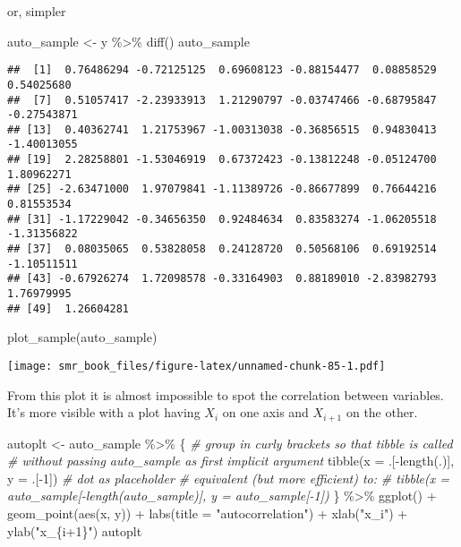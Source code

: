 \documentclass[
  oneside]{book}
\newenvironment{Shaded}{\begin{snugshade}}{\end{snugshade}}
\newcommand{\AttributeTok}[1]{\textcolor[rgb]{0.77,0.63,0.00}{#1}}
\newcommand{\CommentTok}[1]{\textcolor[rgb]{0.56,0.35,0.01}{\textit{#1}}}
\newcommand{\DecValTok}[1]{\textcolor[rgb]{0.00,0.00,0.81}{#1}}
\newcommand{\FunctionTok}[1]{\textcolor[rgb]{0.00,0.00,0.00}{#1}}
\newcommand{\NormalTok}[1]{#1}
\newcommand{\OtherTok}[1]{\textcolor[rgb]{0.56,0.35,0.01}{#1}}
\newcommand{\SpecialCharTok}[1]{\textcolor[rgb]{0.00,0.00,0.00}{#1}}
\newcommand{\StringTok}[1]{\textcolor[rgb]{0.31,0.60,0.02}{#1}}
\begin{document}
or, simpler

\begin{Shaded}
\begin{Highlighting}[]
\NormalTok{auto\_sample }\OtherTok{\textless{}{-}}\NormalTok{ y }\SpecialCharTok{\%\textgreater{}\%}
  \FunctionTok{diff}\NormalTok{()}
\NormalTok{auto\_sample}
\end{Highlighting}
\end{Shaded}

\begin{verbatim}
##  [1]  0.76486294 -0.72125125  0.69608123 -0.88154477  0.08858529  0.54025680
##  [7]  0.51057417 -2.23933913  1.21290797 -0.03747466 -0.68795847 -0.27543871
## [13]  0.40362741  1.21753967 -1.00313038 -0.36856515  0.94830413 -1.40013055
## [19]  2.28258801 -1.53046919  0.67372423 -0.13812248 -0.05124700  1.80962271
## [25] -2.63471000  1.97079841 -1.11389726 -0.86677899  0.76644216  0.81553534
## [31] -1.17229042 -0.34656350  0.92484634  0.83583274 -1.06205518 -1.31356822
## [37]  0.08035065  0.53828058  0.24128720  0.50568106  0.69192514 -1.10511511
## [43] -0.67926274  1.72098578 -0.33164903  0.88189010 -2.83982793  1.76979995
## [49]  1.26604281
\end{verbatim}

\begin{Shaded}
\begin{Highlighting}[]
\FunctionTok{plot\_sample}\NormalTok{(auto\_sample)}
\end{Highlighting}
\end{Shaded}

\texttt{[image: smr\_book\_files/figure-latex/unnamed-chunk-85-1.pdf]}

From this plot it is almost impossible to spot the correlation between variables.
It's more visible with a plot having \(X_i\) on one axis and \(X_{i+1}\) on the other.

\begin{Shaded}
\begin{Highlighting}[]
\NormalTok{autoplt }\OtherTok{\textless{}{-}}\NormalTok{ auto\_sample }\SpecialCharTok{\%\textgreater{}\%}
\NormalTok{  \{ }\CommentTok{\# group in curly brackets so that tibble is called}
    \CommentTok{\# without passing auto\_sample as first implicit argument}
    \FunctionTok{tibble}\NormalTok{(}\AttributeTok{x =}\NormalTok{ .[}\SpecialCharTok{{-}}\FunctionTok{length}\NormalTok{(.)], }\AttributeTok{y =}\NormalTok{ .[}\SpecialCharTok{{-}}\DecValTok{1}\NormalTok{]) }\CommentTok{\# dot as placeholder}
    \CommentTok{\# equivalent (but more efficient) to:}
    \CommentTok{\# tibble(x = auto\_sample[{-}length(auto\_sample)], y = auto\_sample[{-}1])}
\NormalTok{  \} }\SpecialCharTok{\%\textgreater{}\%}
  \FunctionTok{ggplot}\NormalTok{() }\SpecialCharTok{+}
  \FunctionTok{geom\_point}\NormalTok{(}\FunctionTok{aes}\NormalTok{(x, y)) }\SpecialCharTok{+}
  \FunctionTok{labs}\NormalTok{(}\AttributeTok{title =} \StringTok{"autocorrelation"}\NormalTok{) }\SpecialCharTok{+}
  \FunctionTok{xlab}\NormalTok{(}\StringTok{"x\_i"}\NormalTok{) }\SpecialCharTok{+}
  \FunctionTok{ylab}\NormalTok{(}\StringTok{"x\_\{i+1\}"}\NormalTok{)}
\NormalTok{autoplt}
\end{Highlighting}
\end{Shaded}
\end{document}
